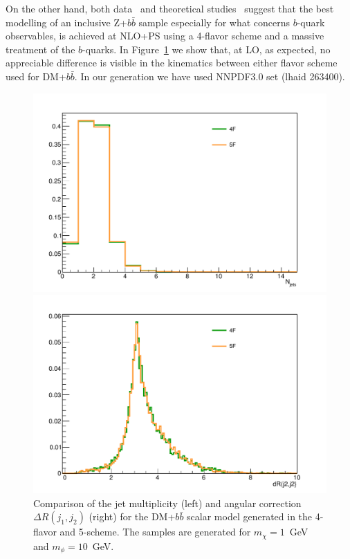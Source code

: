 On the other hand, both data~\cite{Chatrchyan:2014dha,Chatrchyan:2013zja,CMS:2015mba} 
and theoretical studies~\cite{Frederix:2011qg,Wiesemann:2014ioa} suggest that the best modelling of  an 
inclusive Z+$b\bar{b}$ sample especially for what concerns $b$-quark observables, is achieved at NLO+PS using a 4-flavor scheme 
and a massive treatment of the $b$-quarks.  
In Figure~\ref{fig:4Fvs5F} we show that, at LO, as expected, no appreciable difference is visible in the kinematics between 
either flavor scheme used for DM+$b\bar{b}$. In our generation we have used  NNPDF3.0 set (lhaid 263400).

\begin{figure}[h!]
\begin{minipage}{0.49\textwidth}
	\centering 
	\includegraphics[scale=0.32]{figures/bbar/4Fvs5F_plots/Njets}
\end{minipage}
\hfill
\begin{minipage}{0.49\textwidth}
	\centering 
	\includegraphics[scale=0.32]{figures/bbar/4Fvs5F_plots/dR12}
\end{minipage}
\caption{Comparison of the jet multiplicity (left) and angular correction $\Delta R(j_1, j_2)$ (right) for the DM+$b\bar{b}$ scalar model generated in the 4-flavor and 5-scheme.
	The samples are generated for $m_\chi=1$~GeV and $m_\phi=10$~GeV.
	\label{fig:4Fvs5F}}
\end{figure}

